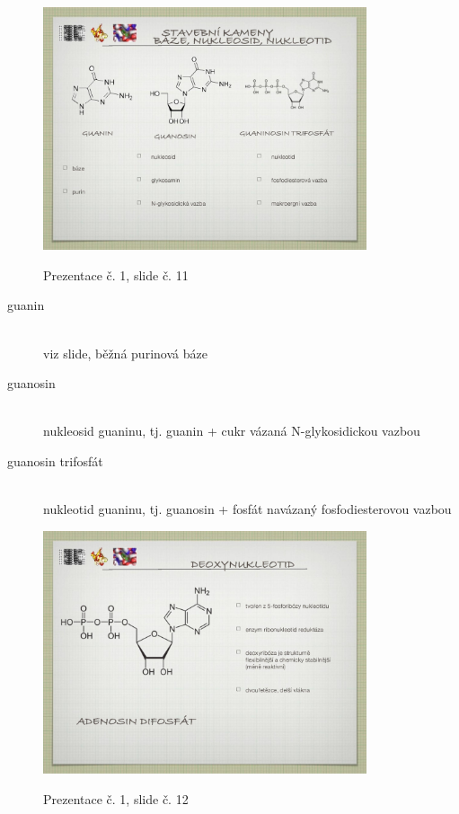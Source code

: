 \documentclass[DIV=8]{scrreprt}
\begin{document}
\begin{figure}
    \caption{Prezentace č. 1, slide č. 11}
    \includegraphics[width=0.85\textwidth]{slides-1/slide-11.jpg}
    \centering
    \label{slides-1-slide-11}
\end{figure}

\begin{description}
\item[guanin]\hfill \\
viz slide, běžná purinová báze


\item[guanosin]\hfill \\
nukleosid guaninu, tj. guanin + cukr vázaná N-glykosidickou vazbou


\item[guanosin trifosfát]\hfill \\
nukleotid guaninu, tj. guanosin + fosfát navázaný fosfodiesterovou vazbou

\end{description}


\begin{figure}
    \caption{Prezentace č. 1, slide č. 12}
    \includegraphics[width=0.85\textwidth]{slides-1/slide-12.jpg}
    \centering
    \label{slides-1-slide-12}
\end{figure}
\end{document}
